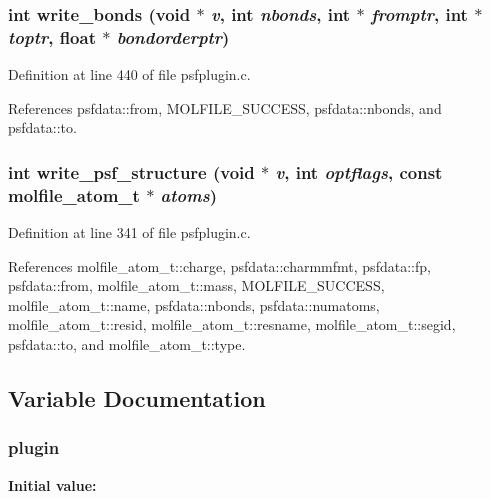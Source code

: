 \subsubsection{\setlength{\rightskip}{0pt plus 5cm}int write\_\-bonds (void $\ast$ {\em v}, int {\em nbonds}, int $\ast$ {\em fromptr}, int $\ast$ {\em toptr}, float $\ast$ {\em bondorderptr})\hspace{0.3cm}{\tt  [static]}}\label{psfplugin_8c_a11}




Definition at line 440 of file psfplugin.c.

References psfdata::from, MOLFILE\_\-SUCCESS, psfdata::nbonds, and psfdata::to.
\subsubsection{\setlength{\rightskip}{0pt plus 5cm}int write\_\-psf\_\-structure (void $\ast$ {\em v}, int {\em optflags}, const {\bf molfile\_\-atom\_\-t} $\ast$ {\em atoms})\hspace{0.3cm}{\tt  [static]}}\label{psfplugin_8c_a10}




Definition at line 341 of file psfplugin.c.

References molfile\_\-atom\_\-t::charge, psfdata::charmmfmt, psfdata::fp, psfdata::from, molfile\_\-atom\_\-t::mass, MOLFILE\_\-SUCCESS, molfile\_\-atom\_\-t::name, psfdata::nbonds, psfdata::numatoms, molfile\_\-atom\_\-t::resid, molfile\_\-atom\_\-t::resname, molfile\_\-atom\_\-t::segid, psfdata::to, and molfile\_\-atom\_\-t::type.

\subsection{Variable Documentation}
\subsubsection{ plugin\hspace{0.3cm}{\tt  [static]}}\label{psfplugin_8c_a1}


{\bf Initial value:}

